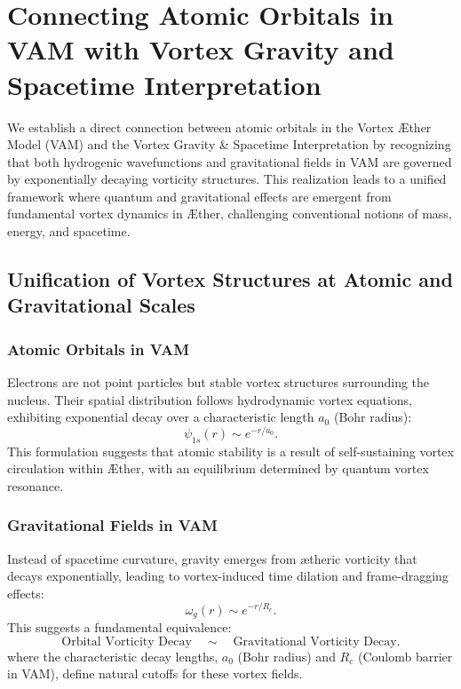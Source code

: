 \documentclass[a4paper,10pt]{article}
\begin{document}
    
\section{Connecting Atomic Orbitals in VAM with Vortex Gravity and Spacetime Interpretation}


We establish a direct connection between atomic orbitals in the Vortex Æther Model (VAM) and the Vortex Gravity \& Spacetime Interpretation by recognizing that both hydrogenic wavefunctions and gravitational fields in VAM are governed by exponentially decaying vorticity structures. This realization leads to a unified framework where quantum and gravitational effects are emergent from fundamental vortex dynamics in Æther, challenging conventional notions of mass, energy, and spacetime.


\subsection*{Unification of Vortex Structures at Atomic and Gravitational Scales}


\subsubsection*{Atomic Orbitals in VAM}
Electrons are not point particles but stable vortex structures surrounding the nucleus. Their spatial distribution follows hydrodynamic vortex equations, exhibiting exponential decay over a characteristic length $a_0$ (Bohr radius):
\begin{equation*}
\psi_{1s}(r) \sim e^{-r/a_0}.
\end{equation*}
This formulation suggests that atomic stability is a result of self-sustaining vortex circulation within Æther, with an equilibrium determined by quantum vortex resonance.


\subsubsection*{Gravitational Fields in VAM}
Instead of spacetime curvature, gravity emerges from ætheric vorticity that decays exponentially, leading to vortex-induced time dilation and frame-dragging effects:
\begin{equation*}
\omega_{g}(r) \sim e^{-r/R_c}.
\end{equation*}
This suggests a fundamental equivalence:
\begin{equation*}
\text{Orbital Vorticity Decay} \quad \sim \quad \text{Gravitational Vorticity Decay}.
\end{equation*}
where the characteristic decay lengths, $a_0$ (Bohr radius) and $R_c$ (Coulomb barrier in VAM), define natural cutoffs for these vortex fields.
\end{document}
